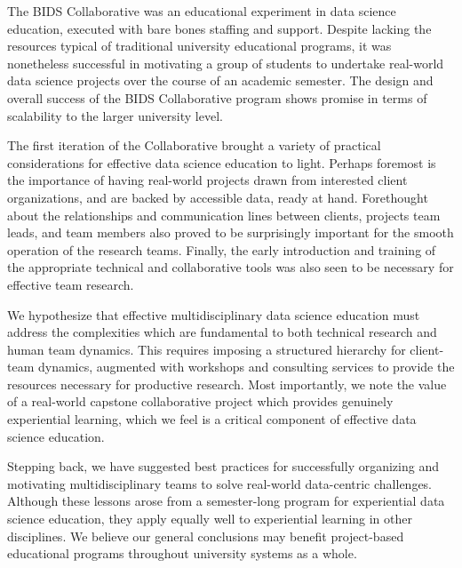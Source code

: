 \documentclass[12pt]{article}
\begin{document}
The BIDS Collaborative was an educational experiment in data science education, executed with bare bones staffing and support. Despite lacking the resources typical of traditional university educational programs, it was nonetheless successful in motivating a group of students to undertake real-world data science projects over the course of an academic semester.  The design and overall success of the BIDS Collaborative program shows promise in terms of scalability to the larger university level.

The first iteration of the Collaborative brought a variety of practical considerations for effective data science education to light.  Perhaps foremost is the importance of having real-world projects drawn from interested client organizations, and are backed by accessible data, ready at hand.  Forethought about the relationships and communication lines between clients, projects team leads, and team members also proved to be surprisingly important for the smooth operation of the research teams.  Finally, the early introduction and training of the appropriate technical and collaborative tools was also seen to be necessary for effective team research.

We hypothesize that effective multidisciplinary data science education must address the complexities which are fundamental to both technical research and human team dynamics. This requires imposing a structured hierarchy for client-team dynamics, augmented with workshops and consulting services to provide the resources necessary for productive research.  Most importantly, we note the value of a real-world capstone collaborative project which provides genuinely experiential learning, which we feel is a critical component of effective data science education.

Stepping back, we have suggested best practices for successfully organizing and motivating multidisciplinary teams to solve real-world data-centric challenges.  Although these lessons arose from a semester-long program for experiential data science education, they apply equally well to experiential learning in other disciplines.  We believe our general conclusions may benefit project-based educational programs throughout university systems as a whole.



\newpage

%
%

\newpage
\printbibliography
\end{document}

